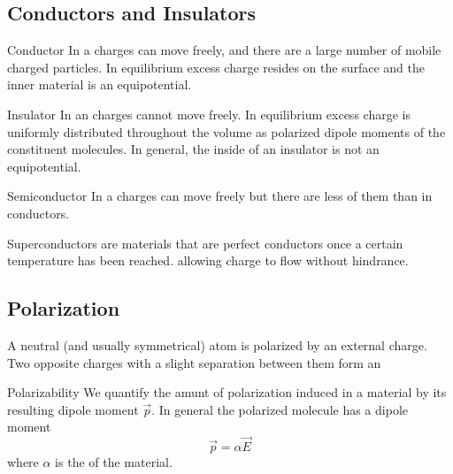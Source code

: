 \documentclass[12pt]{report}
\begin{document}
\subsection{Conductors and Insulators}

\begin{defn}{Conductor}{}
        In a  charges can move freely, and there are a large number of mobile charged particles. In equilibrium excess charge resides on the surface and the inner material is an equipotential.
\end{defn}


\begin{defn}{Insulator}{}
        In an  charges cannot move freely. In equilibrium excess charge is uniformly distributed throughout the volume as polarized dipole moments of the constituent molecules. In general, the inside of an insulator is not an equipotential.
\end{defn}

\begin{defn}{Semiconductor}{}
        In a  charges can move freely but there are less of them than in conductors.
\end{defn}


\begin{defn}{Superconductors}{}
         are materials that are perfect conductors once a certain temperature has been reached. allowing charge to flow without hindrance.
\end{defn}


\subsection{Polarization}

\begin{defn}{}{}
        A neutral (and usually symmetrical) atom is polarized by an external charge. Two opposite charges with a slight separation between them form an 
\end{defn}

\begin{defn}{Polarizability}{}
        We quantify the amunt of polarization induced in a material by its resulting dipole moment $\vec{p}$. In general the polarized molecule has a dipole moment \begin{equation}
                \vec{p} = \alpha \vec{E}
        \end{equation}
        where $\alpha$ is the  of the material.
\end{defn}
\end{document}
